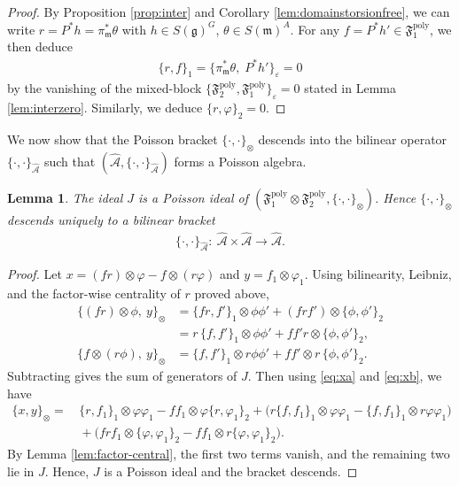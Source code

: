\documentclass[11pt]{amsart}
\newtheorem{lemma}[theorem]{Lemma}
\theoremstyle{definition}
\theoremstyle{plain}
\theoremstyle{conclusion}
\begin{document}
\begin{proof}
By Proposition \ref{prop:inter} and Corollary \ref{lem:domainstorsionfree}, we can write $r=P^*h=\pi_\mathfrak{m}^*\theta$ with $h\in S(\mathfrak{g})^G$, $\theta\in S(\mathfrak{m})^A$. For any $f=P^*h' \in \mathfrak{F}_1^{\mathrm{poly}}$, we then deduce \begin{align*}
    \{r,f\}_1=\{\pi_\mathfrak{m}^*\theta,\;P^*h'\}_\varepsilon=0
\end{align*} by the vanishing of the mixed-block $\{\mathfrak{F}_2^{\mathrm{poly}},\mathfrak{F}_1^{\mathrm{poly}}\}_\varepsilon=0$ stated in Lemma \ref{lem:interzero}. Similarly, we deduce $\{r,\varphi\}_2=0$.
\end{proof}

We now show that the Poisson bracket $\{\cdot,\cdot\}_{\otimes}$ descends into the bilinear operator $\{\cdot,\cdot\}_{\widehat{\mathcal{A}}}$ such that $\left(\widehat{\mathcal{A}},\{\cdot,\cdot\}_{\widehat{\mathcal{A}}}\right)$ forms a Poisson algebra.

\begin{lemma} 
The ideal $J$ is a Poisson ideal of $\left(\mathfrak{F}_1^{\mathrm{poly}}\otimes \mathfrak{F}_2^{\mathrm{poly}},\{\cdot,\cdot\}_\otimes\right)$. Hence $\{\cdot,\cdot\}_\otimes$ descends uniquely to a bilinear bracket
\begin{align*}
\{\cdot,\cdot\}_{\widehat{\mathcal{A}}}:\ \widehat{\mathcal{A}}\times \widehat{\mathcal{A}}\longrightarrow \widehat{\mathcal{A}}.
\end{align*}
\end{lemma}

\begin{proof}
Let $x=(fr)\otimes\varphi - f\otimes(r\varphi)$ and $y=f_1\otimes\varphi_1$.  Using bilinearity, Leibniz, and the factor-wise centrality of $r$ proved above, \begin{align}
\nonumber
\{(fr) \otimes \phi,\ y\}_\otimes &=\{fr,f'\}_1 \otimes \phi\phi'+(fr f') \otimes \{\phi,\phi'\}_2\\
&=r\,\{f,f'\}_1 \otimes \phi\phi'+ff'r \otimes \{\phi,\phi'\}_2, \label{eq:xa}\\
\{f \otimes (r\phi),\ y\}_\otimes
&=\{f,f'\}_1 \otimes r\phi\phi'+ff' \otimes r\,\{\phi,\phi'\}_2. \label{eq:xb}
\end{align}  Subtracting gives the sum of generators of $J$. Then using \eqref{eq:xa} and \eqref{eq:xb}, we have \begin{align*}
    \{x,y\}_\otimes = & \, \{r,f_1\}_1\otimes\varphi\varphi_1 - ff_1\otimes \varphi\{r,\varphi_1\}_2+ \big(r\{f,f_1\}_1\otimes\varphi\varphi_1 - \{f,f_1\}_1\otimes r\varphi\varphi_1\big) \\
& \, +  \big(fr f_1\otimes\{\varphi,\varphi_1\}_2 - ff_1\otimes r\{\varphi,\varphi_1\}_2\big).
\end{align*} By Lemma \ref{lem:factor-central}, the first two terms vanish, and the remaining two lie in $J$. Hence, $J$ is a Poisson ideal and the bracket descends.  
\end{proof}
\end{document}
